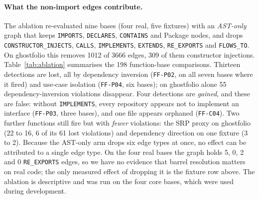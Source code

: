\documentclass[10pt,a4paper]{article}
\newcommand{\edge}[1]{\texttt{\small #1}}
\newcommand{\ff}[1]{\texttt{\small #1}}
\begin{document}
\paragraph{What the non-import edges contribute.}
The ablation re-evaluated nine bases (four real, five fixtures) with an \emph{AST-only} graph that keeps
\edge{IMPORTS}, \edge{DECLARES}, \edge{CONTAINS} and Package nodes, and drops \edge{CONSTRUCTOR\_INJECTS},
\edge{CALLS}, \edge{IMPLEMENTS}, \edge{EXTENDS}, \edge{RE\_EXPORTS} and \edge{FLOWS\_TO}. On ghostfolio this removes
1012 of 3666 edges, 309 of them constructor injections. %
Table~\ref{tab:ablation} summarises the 198 function-base comparisons. Thirteen detections are lost, all by
dependency inversion (\ff{FF-P02}, on all seven bases where it fired) and use-case isolation (\ff{FF-P04}, six
bases); on ghostfolio alone 55 dependency-inversion violations disappear. Four detections are \emph{gained}, and
these are false: without \edge{IMPLEMENTS}, every repository appears not to implement an interface (\ff{FF-P03},
three bases), and one file appears orphaned (\ff{FF-C04}). Two further functions still fire but with
\emph{fewer} violations: the SRP proxy on ghostfolio (22 to 16, 6 of its 61 lost violations) and dependency
direction on one fixture (3 to 2). %
Because the AST-only arm drops six edge types at once, no effect can be attributed to a single edge type. On the
four real bases the graph holds 5, 0, 2 and 0 \edge{RE\_EXPORTS} edges, so we have no evidence that barrel
resolution matters on real code; the only measured effect of dropping it is the fixture row above.
The ablation is descriptive and was run on the four core bases, which were used during development.
\end{document}
